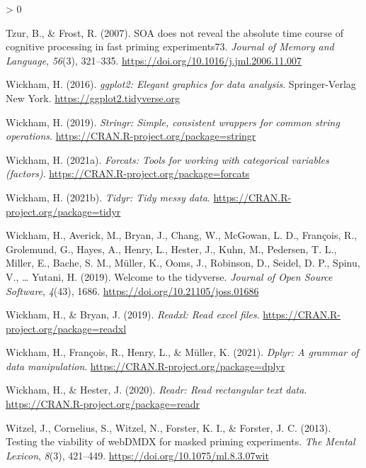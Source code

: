 \documentclass[
  english,
  man,floatsintext]{apa6}
\newlength{\cslhangindent}
\newenvironment{CSLReferences}[2] %
 {%
  \setlength{\parindent}{0pt}
  \ifodd #1 \everypar{\setlength{\hangindent}{\cslhangindent}}\ignorespaces\fi
  \ifnum #2 > 0
  \setlength{\parskip}{#2\baselineskip}
  \fi
 }%
 {}
\begin{document}
\begin{CSLReferences}{1}{0}
\leavevmode\hypertarget{ref-Tzur_2007}{}%
Tzur, B., \& Frost, R. (2007). {SOA} does not reveal the absolute time course of cognitive processing in fast priming experiments{{73}}. \emph{Journal of Memory and Language}, \emph{56}(3), 321--335. \url{https://doi.org/10.1016/j.jml.2006.11.007}

\leavevmode\hypertarget{ref-R-ggplot2}{}%
Wickham, H. (2016). \emph{ggplot2: Elegant graphics for data analysis}. Springer-Verlag New York. \url{https://ggplot2.tidyverse.org}

\leavevmode\hypertarget{ref-R-stringr}{}%
Wickham, H. (2019). \emph{Stringr: Simple, consistent wrappers for common string operations}. \url{https://CRAN.R-project.org/package=stringr}

\leavevmode\hypertarget{ref-R-forcats}{}%
Wickham, H. (2021a). \emph{Forcats: Tools for working with categorical variables (factors)}. \url{https://CRAN.R-project.org/package=forcats}

\leavevmode\hypertarget{ref-R-tidyr}{}%
Wickham, H. (2021b). \emph{Tidyr: Tidy messy data}. \url{https://CRAN.R-project.org/package=tidyr}

\leavevmode\hypertarget{ref-R-tidyverse}{}%
Wickham, H., Averick, M., Bryan, J., Chang, W., McGowan, L. D., François, R., Grolemund, G., Hayes, A., Henry, L., Hester, J., Kuhn, M., Pedersen, T. L., Miller, E., Bache, S. M., Müller, K., Ooms, J., Robinson, D., Seidel, D. P., Spinu, V., \ldots{} Yutani, H. (2019). Welcome to the {tidyverse}. \emph{Journal of Open Source Software}, \emph{4}(43), 1686. \url{https://doi.org/10.21105/joss.01686}

\leavevmode\hypertarget{ref-R-readxl}{}%
Wickham, H., \& Bryan, J. (2019). \emph{Readxl: Read excel files}. \url{https://CRAN.R-project.org/package=readxl}

\leavevmode\hypertarget{ref-R-dplyr}{}%
Wickham, H., François, R., Henry, L., \& Müller, K. (2021). \emph{Dplyr: A grammar of data manipulation}. \url{https://CRAN.R-project.org/package=dplyr}

\leavevmode\hypertarget{ref-R-readr}{}%
Wickham, H., \& Hester, J. (2020). \emph{Readr: Read rectangular text data}. \url{https://CRAN.R-project.org/package=readr}

\leavevmode\hypertarget{ref-witzelTestingViabilityWebDMDX2013}{}%
Witzel, J., Cornelius, S., Witzel, N., Forster, K. I., \& Forster, J. C. (2013). Testing the viability of {webDMDX} for masked priming experiments. \emph{The Mental Lexicon}, \emph{8}(3), 421--449. \url{https://doi.org/10.1075/ml.8.3.07wit}


\end{CSLReferences}
\end{document}
